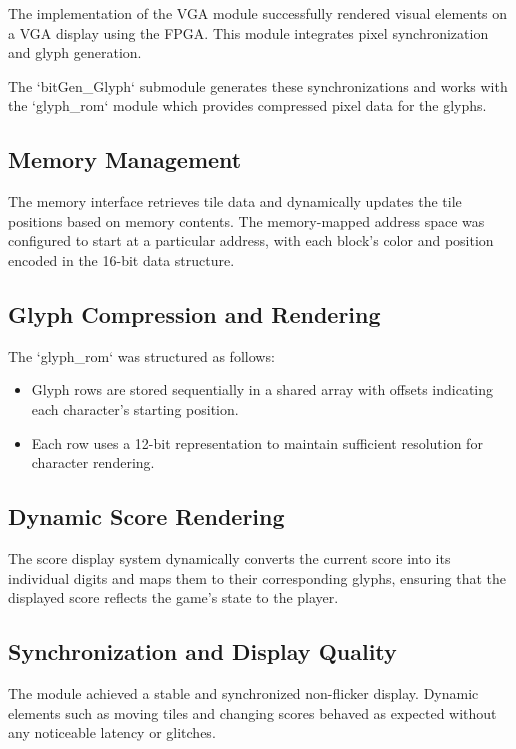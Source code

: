 \documentclass{subfile}
\begin{document}

  The implementation of the VGA module successfully rendered visual elements on a VGA display using the FPGA. This module integrates pixel synchronization and glyph generation.

  The `bitGen\_Glyph` submodule generates these synchronizations and works with the `glyph\_rom` module which provides compressed pixel data for the glyphs.

  \subsection{Memory Management}
  The memory interface retrieves tile data and dynamically updates the tile positions based on memory contents. The memory-mapped address space was configured to start at a particular address, with each block's color and position encoded in the 16-bit data structure. 

  \subsection{Glyph Compression and Rendering}
  The `glyph\_rom` was structured as follows:
  \begin{itemize}
      \item Glyph rows are stored sequentially in a shared array with offsets indicating each character's starting position.
      \item Each row uses a 12-bit representation to maintain sufficient resolution for character rendering.
  \end{itemize}

  \subsection{Dynamic Score Rendering}
  The score display system dynamically converts the current score into its individual digits and maps them to their corresponding glyphs, ensuring that the displayed score reflects the game's state to the player. 

  \subsection{Synchronization and Display Quality}
  The module achieved a stable and synchronized non-flicker display. Dynamic elements such as moving tiles and changing scores behaved as expected without any noticeable latency or glitches.
\end{document}
